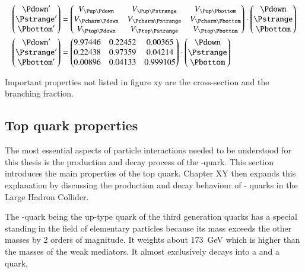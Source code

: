 \begin{align}
\begin{pmatrix}
\Pdown^{\prime} \\
\Pstrange^{\prime} \\
\Pbottom^{\prime}
\end{pmatrix}
&=
\begin{pmatrix}
\Vud & \Vus & \Vub \\
\Vcd & \Vcs & \Vcb \\
\Vtd & \Vts & \Vtb \\
\end{pmatrix}
\cdot
\begin{pmatrix}
\Pdown \\
\Pstrange \\
\Pbottom
\end{pmatrix}\\
%
\begin{pmatrix}
\Pdown^{\prime} \\
\Pstrange^{\prime} \\
\Pbottom^{\prime}
\end{pmatrix}
&=
\begin{pmatrix}
9.97446 & 0.22452 & 0.00365 \\
0.22438 & 0.97359 & 0.04214 \\
0.00896 & 0.04133 & 0.999105 \\
\end{pmatrix}
\cdot
\begin{pmatrix}
\Pdown \\
\Pstrange \\
\Pbottom
\end{pmatrix}
\end{align}

Important properties not listed in figure xy are the cross-section and the branching fraction.

\subsection{Top quark properties}

The most essential aspects of particle interactions needed to be understood for this thesis is the production and decay process of the \Ptop-quark. This section introduces the main properties of the top quark. Chapter XY then expands this explanation by discussing the production and decay behaviour of \Ptop- quarks in the Large Hadron Collider.

The \Ptop-quark being the up-type quark of the third generation quarks has a special standing in the field of elementary particles because its mass exceeds the other masses by \num{2} orders of magnitude. It weights about \SI{173}{\giga \electronvolt} which is higher than the masses of the weak mediators. It almost exclusively decays into a \PW and a \Pbottom quark,

